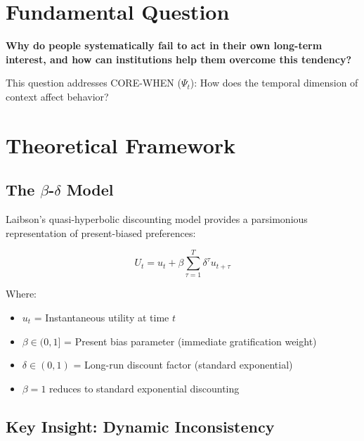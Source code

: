\section{Fundamental Question}

\begin{tcolorbox}[colback=yellow!10!white,colframe=orange!75!black,title=Central Research Question]
\textbf{Why do people systematically fail to act in their own long-term interest, and how can institutions help them overcome this tendency?}
\end{tcolorbox}

This question addresses CORE-WHEN ($\Psi_t$): How does the temporal dimension of context affect behavior?

\section{Theoretical Framework}

\subsection{The $\beta$-$\delta$ Model}

Laibson's quasi-hyperbolic discounting model provides a parsimonious representation of present-biased preferences:

\begin{equation}
U_t = u_t + \beta \sum_{\tau=1}^{T} \delta^\tau u_{t+\tau}
\end{equation}

Where:
\begin{itemize}
    \item $u_t$ = Instantaneous utility at time $t$
    \item $\beta \in (0,1]$ = Present bias parameter (immediate gratification weight)
    \item $\delta \in (0,1)$ = Long-run discount factor (standard exponential)
    \item $\beta = 1$ reduces to standard exponential discounting
\end{itemize}

\subsection{Key Insight: Dynamic Inconsistency}

